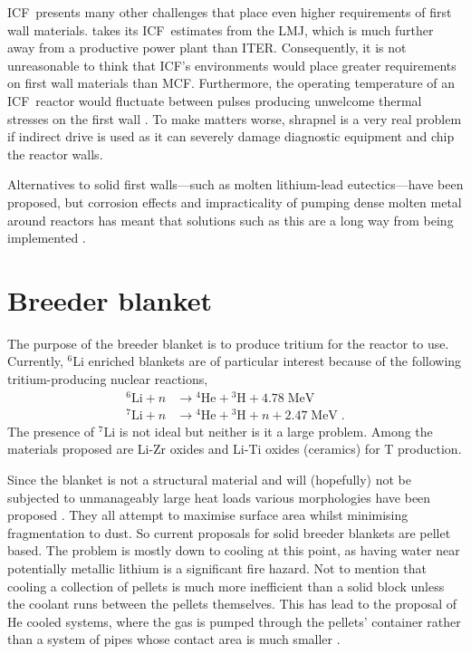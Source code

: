 \documentclass[12pt, a4paper]{article}
\newcommand{\mc}{MCF}
\newcommand{\ic}{ICF}
\begin{document}
		\ic~presents many other challenges that place even higher requirements of first wall materials.  takes its \ic~estimates from the LMJ, which is much further away from a productive power plant than ITER. Consequently, it is not unreasonable to think that \ic's environments would place greater requirements on first wall materials than \mc. Furthermore, the operating temperature of an \ic~reactor would fluctuate between pulses producing unwelcome thermal stresses on the first wall \cite{ict1, ict2}. To make matters worse, shrapnel is a very real problem if indirect drive is used as it can severely damage diagnostic equipment and chip the reactor walls.
		
		Alternatives to solid first walls---such as molten lithium-lead eutectics---have been proposed, but corrosion effects and impracticality of pumping dense molten metal around reactors has meant that solutions such as this are a long way from being implemented \cite{lfw1, lfw2, lfw3}.
	\section{Breeder blanket}
		The purpose of the breeder blanket is to produce tritium for the reactor to use. Currently, $^{6}$Li enriched blankets are of particular interest because of the following tritium-producing nuclear reactions,
		\begin{align}
			\textrm{$^{6}$Li} + n &\to \textrm{$^{4}$He} + \textrm{$^{3}$H} + 4.78\; \textrm{MeV} \\
			\textrm{$^{7}$Li} + n &\to \textrm{$^{4}$He} + \textrm{$^{3}$H} + n + 2.47\; \textrm{MeV}\; .
		\end{align}
		The presence of $^{7}$Li is not ideal but neither is it a large problem. Among the materials proposed are Li-Zr oxides and Li-Ti oxides (ceramics) for T production.
		
		Since the blanket is not a structural material and will (hopefully) not be subjected to unmanageably large heat loads various morphologies have been proposed \cite{bb1, bb2, bb3}. They all attempt to maximise surface area whilst minimising fragmentation to dust. So current proposals for solid breeder blankets are pellet based. The problem is mostly down to cooling at this point, as having water near potentially metallic lithium is a significant fire hazard. Not to mention that cooling a collection of pellets is much more inefficient than a solid block unless the coolant runs between the pellets themselves. This has lead to the proposal of He cooled systems, where the gas is pumped through the pellets' container rather than a system of pipes whose contact area is much smaller \cite{bb4}.
		
\end{document}
